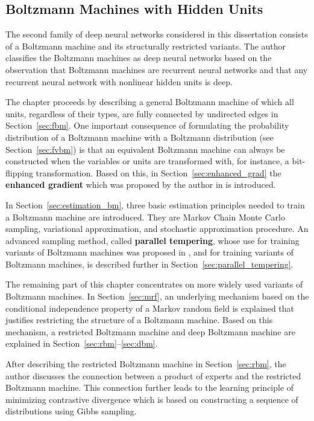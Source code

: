 \documentclass[dissertation,nocontribution]{aaltoseries}
\begin{document}
\subsection{Boltzmann Machines with Hidden Units}

The second family of deep neural networks considered in this
dissertation consists of a Boltzmann machine and its
structurally restricted variants. The author classifies the
Boltzmann machines as deep neural networks based on the
observation that Boltzmann machines are recurrent neural
networks and that any recurrent neural network with
nonlinear hidden units is deep.

The chapter proceeds by describing a general
Boltzmann machine of which all units, regardless of their
types, are fully connected by undirected edges in
Section~\ref{sec:fbm}. One important consequence of
formulating the probability distribution of a Boltzmann
machine with a Boltzmann distribution (see
Section~\ref{sec:fvbm}) is that an equivalent Boltzmann
machine can always be constructed when the variables or
units are transformed with, for instance, a bit-flipping
transformation. Based on this, in
Section~\ref{sec:enhanced_grad} the
\textbf{enhanced gradient} which was proposed by
the author in  is introduced.

In Section~\ref{sec:estimation_bm}, three basic estimation
principles needed to train a Boltzmann machine are
introduced. They are Markov Chain Monte Carlo
sampling, variational approximation, and
stochastic approximation procedure. An advanced
sampling method, called \textbf{parallel
tempering}, whose use for training variants of Boltzmann
machines was proposed in ,
 and  for
training variants of Boltzmann machines, is described
further in Section~\ref{sec:parallel_tempering}.

The remaining part of this chapter concentrates on more
widely used variants of Boltzmann machines. In
Section~\ref{sec:mrf}, an underlying mechanism based on the
conditional independence property of a Markov random field
is explained that justifies restricting the structure of a
Boltzmann machine. Based on this mechanism, a
restricted Boltzmann machine and deep
Boltzmann machine are explained in
Section~\ref{sec:rbm}--\ref{sec:dbm}.

After describing the restricted Boltzmann machine in
Section~\ref{sec:rbm}, the author discusses the connection
between a product of experts and the restricted Boltzmann
machine. This connection further leads to the learning
principle of minimizing contrastive divergence
which is based on constructing a sequence of distributions
using Gibbs sampling.
\end{document}
